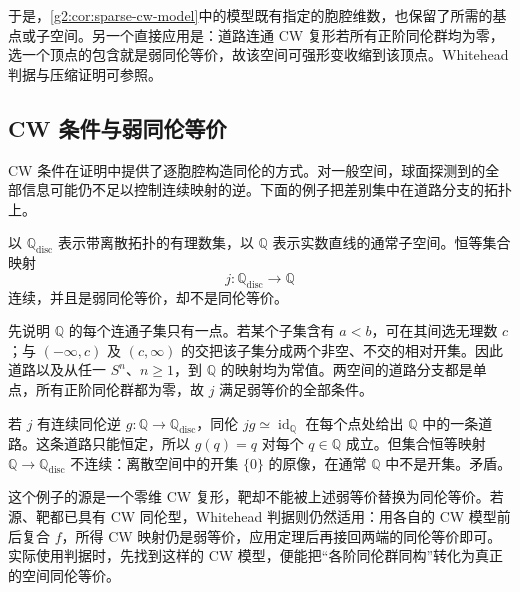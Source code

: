于是，\cref{g2:cor:sparse-cw-model}中的模型既有指定的胞腔维数，也保留了所需的基点或子空间。另一个直接应用是：道路连通 CW 复形若所有正阶同伦群均为零，选一个顶点的包含就是弱同伦等价，故该空间可强形变收缩到该顶点。Whitehead 判据与压缩证明可参照\cite[第4.1节，Whitehead's Theorem]{Hatcher2002}。

\subsection{CW 条件与弱同伦等价}
\label{g2:subsec:0903:04}

CW 条件在证明中提供了逐胞腔构造同伦的方式。对一般空间，球面探测到的全部信息可能仍不足以控制连续映射的逆。下面的例子把差别集中在道路分支的拓扑上。

\begin{example}\label{g2:exm:rationals-weak-equivalence}
	以 \(\mathbb Q_{\mathrm{disc}}\) 表示带离散拓扑的有理数集，以 \(\mathbb Q\) 表示实数直线的通常子空间。恒等集合映射
	\[
		j:\mathbb Q_{\mathrm{disc}}\longrightarrow\mathbb Q
	\]
	连续，并且是弱同伦等价，却不是同伦等价。

	先说明 \(\mathbb Q\) 的每个连通子集只有一点。若某个子集含有 \(a<b\)，可在其间选无理数 \(c\)；与 \(({-\infty},c)\) 及 \((c,\infty)\) 的交把该子集分成两个非空、不交的相对开集。因此道路以及从任一 \(S^n\)、\(n\ge1\)，到 \(\mathbb Q\) 的映射均为常值。两空间的道路分支都是单点，所有正阶同伦群都为零，故 \(j\) 满足弱等价的全部条件。

	若 \(j\) 有连续同伦逆 \(g:\mathbb Q\rightarrow\mathbb Q_{\mathrm{disc}}\)，同伦 \(jg\simeq\operatorname{id}_{\mathbb Q}\) 在每个点处给出 \(\mathbb Q\) 中的一条道路。这条道路只能恒定，所以 \(g(q)=q\) 对每个 \(q\in\mathbb Q\) 成立。但集合恒等映射 \(\mathbb Q\rightarrow\mathbb Q_{\mathrm{disc}}\) 不连续：离散空间中的开集 \(\{0\}\) 的原像，在通常 \(\mathbb Q\) 中不是开集。矛盾。
\end{example}

这个例子的源是一个零维 CW 复形，靶却不能被上述弱等价替换为同伦等价。若源、靶都已具有 CW 同伦型，Whitehead 判据则仍然适用：用各自的 CW 模型前后复合 \(f\)，所得 CW 映射仍是弱等价，应用定理后再接回两端的同伦等价即可。实际使用判据时，先找到这样的 CW 模型，便能把“各阶同伦群同构”转化为真正的空间同伦等价。

